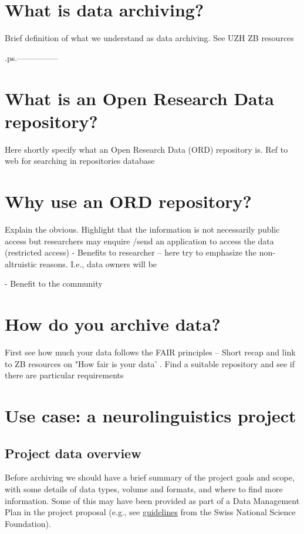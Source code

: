 \documentclass[a4paper,11pt]{report}\usepackage[]{graphicx}\usepackage[dvipsnames]{xcolor}
\begin{document}
\section*{What is data archiving?}
Brief definition of what we understand as data archiving. See UZH ZB resources 

.ps.---------------

\section*{What is an Open Research Data repository?}
Here shortly specify what an Open Research Data (ORD) repository is. Ref to web for searching in repositories database 

\section*{Why use an ORD repository?}
Explain the obvious. Highlight that the information is not necessarily public access but researchers may enquire /send an application to access the data (restricted access)
- Benefits to researcher -- here try to emphasize the non-altruistic reasons. I.e., data owners will be 

- Benefit to the community
\section*{How do you archive data?}
 First see how much your data follows the FAIR principles -- Short recap and link to ZB resources on "How fair is your data' . 
 Find a suitable repository and see if there are particular requirements




\section*{Use case: a neurolinguistics project} 

\subsection*{Project data overview}
Before archiving we should have a brief summary of the project goals and scope, with some details of data types, volume and formats, and where to find more information. Some of this may have been provided as part of a Data Management Plan in the project proposal (e.g., see \href{https://www.snf.ch/en/FAiWVH4WvpKvohw9/topic/research-policies}{guidelines} from the Swiss National Science Foundation).
\end{document}
